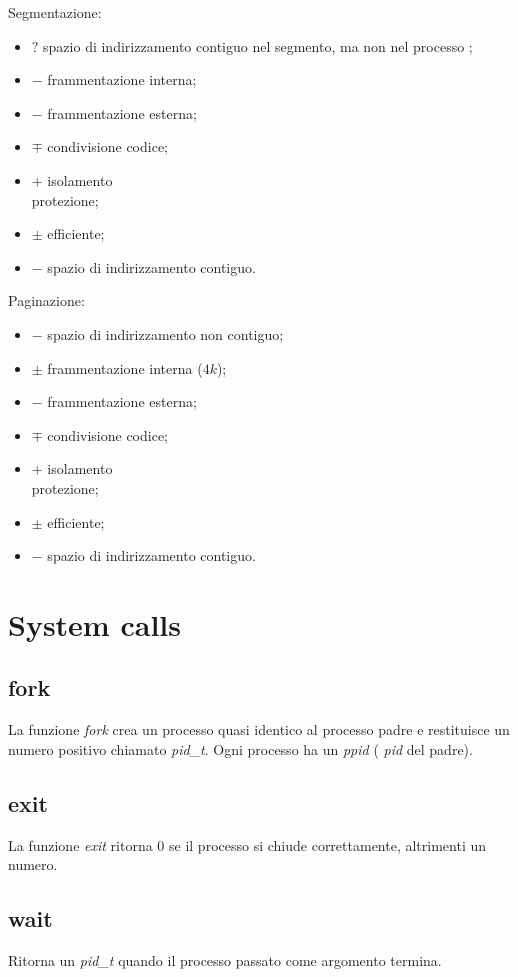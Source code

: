 Segmentazione:
\begin{itemize}
  \item $?$ spazio di indirizzamento contiguo nel segmento, ma non nel processo
    ;
  \item $-$ frammentazione interna;
  \item $-$ frammentazione esterna;
  \item $\mp$ condivisione codice;
  \item $+$ isolamento\\protezione;
  \item $\pm$ efficiente;
  \item $-$ spazio di indirizzamento contiguo.
\end{itemize}

Paginazione:
\begin{itemize}
  \item $-$ spazio di indirizzamento non contiguo;
  \item $\pm$ frammentazione interna ($4k$);
  \item $-$ frammentazione esterna;
  \item $\mp$ condivisione codice;
  \item $+$ isolamento\\protezione;
  \item $\pm$ efficiente;
  \item $-$ spazio di indirizzamento contiguo.
\end{itemize}

\section{System calls}
\subsection{fork}
La funzione \emph{fork} crea un processo quasi identico al processo padre e
restituisce un numero positivo chiamato \emph{pid\_t}.
Ogni processo ha un \emph{ppid} ( \emph{pid} del padre).

\subsection{exit}
La funzione \emph{exit} ritorna $0$ se il processo si chiude correttamente,
altrimenti un numero.

\subsection{wait}
Ritorna un \emph{pid\_t} quando il processo passato come argomento termina. 

